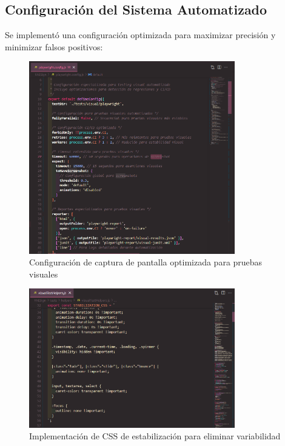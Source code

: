\documentclass{article}
\begin{document}
\subsection{Configuración del Sistema Automatizado}

Se implementó una configuración optimizada para maximizar precisión y minimizar falsos positivos:

\begin{figure}[H]
\centering
\includegraphics[width=0.8\textwidth]{playwright/configuracionScreen.png}
\caption{Configuración de captura de pantalla optimizada para pruebas visuales}
\label{fig:playwright-screen-config}
\end{figure}

\begin{figure}[H]
\centering
\includegraphics[width=0.8\textwidth]{playwright/EstabilizacionCSS.png}
\caption{Implementación de CSS de estabilización para eliminar variabilidad}
\label{fig:playwright-css-stabilization}
\end{figure}
\end{document}
